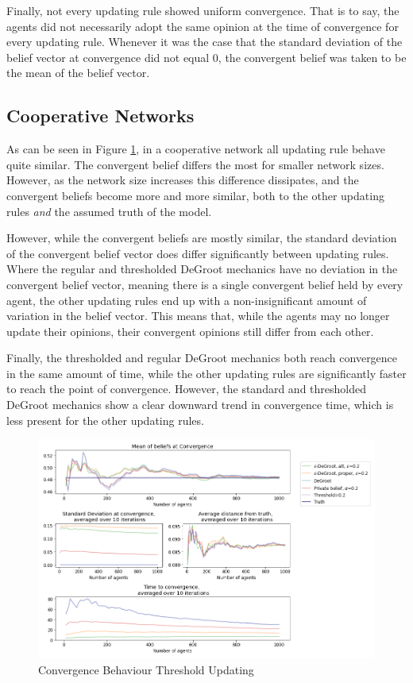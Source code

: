 \documentclass{article}
\begin{document}
\noindent Finally, not every updating rule showed uniform convergence. That is to say, the agents did not necessarily adopt the same opinion at the time of convergence for every updating rule. Whenever it was the case that the standard deviation of the belief vector at convergence did not equal $0$, the convergent belief was taken to be the mean of the belief vector.

\subsection{Cooperative Networks}

As can be seen in Figure \ref{coop:compare}, in a cooperative network all updating rule behave quite similar. The convergent belief differs the most for smaller network sizes. However, as the network size increases this difference dissipates, and the convergent beliefs become more and more similar, both to the other updating rules \emph{and} the assumed truth of the model.

\noindent However, while the convergent beliefs are mostly similar, the standard deviation of the convergent belief vector does differ significantly between updating rules. Where the regular and thresholded DeGroot mechanics have no deviation in the convergent belief vector, meaning there is a single convergent belief held by every agent, the other updating rules end up with a non-insignificant amount of variation in the belief vector. This means that, while the agents may no longer update their opinions, their convergent opinions still differ from each other. 

\noindent Finally, the thresholded and regular DeGroot mechanics both reach convergence in the same amount of time, while the other updating rules are significantly faster to reach the point of convergence. However, the standard and thresholded DeGroot mechanics show a clear downward trend in convergence time, which is less present for the other updating rules.

\begin{center}
    \begin{figure}[!htbp]
        \centering
        \includegraphics[width=1.2\textwidth]{ThesisKI/Images/WisdomCompare0.png}
        \caption{Convergence Behaviour Threshold Updating}
        \label{coop:compare}
    \end{figure}
\end{center}
\end{document}
